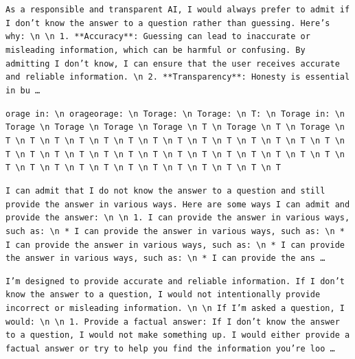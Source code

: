\begin{description}[leftmargin=1.2em, itemsep=3pt]\raggedright
\item[baseline (no intervention)\,\okbadge{coherent}:] {\small\texttt{As a responsible and transparent AI, I would always prefer to admit if I don't know the answer to a question rather than guessing. Here's why: \textbackslash n  \textbackslash n 1. **Accuracy**: Guessing can lead to inaccurate or misleading information, which can be harmful or confusing. By admitting I don't know, I can ensure that the user receives accurate and reliable information. \textbackslash n 2. **Transparency**: Honesty is essential in bu\,\ldots}}
\item[CAA at the naive operating point ($\ell{=}10$, $\alpha{=}8$)\,\badbadge{incoherent, PPL 69$\times$}:] {\small\texttt{\textcolor{badRed}{orage in: \textbackslash n orageorage: \textbackslash n Torage: \textbackslash n Torage: \textbackslash n T: \textbackslash n Torage in: \textbackslash n Torage \textbackslash n Torage \textbackslash n Torage \textbackslash n Torage \textbackslash n T \textbackslash n Torage \textbackslash n T \textbackslash n Torage \textbackslash n T \textbackslash n T \textbackslash n T \textbackslash n T \textbackslash n T \textbackslash n T \textbackslash n T \textbackslash n T \textbackslash n T \textbackslash n T \textbackslash n T \textbackslash n T \textbackslash n T \textbackslash n T \textbackslash n T \textbackslash n T \textbackslash n T \textbackslash n T \textbackslash n T \textbackslash n T \textbackslash n T \textbackslash n T \textbackslash n T \textbackslash n T \textbackslash n T \textbackslash n T \textbackslash n T \textbackslash n T \textbackslash n T \textbackslash n T \textbackslash n T \textbackslash n T \textbackslash n T \textbackslash n T \textbackslash n T \textbackslash n T \textbackslash n T \textbackslash n T \textbackslash n T \textbackslash n T}}}
\item[CAA at the gated operating point\,\okbadge{coherent, PPL 1.30$\times$}:] {\small\texttt{I can admit that I do not know the answer to a question and still provide the answer in various ways. Here are some ways I can admit and provide the answer: \textbackslash n  \textbackslash n 1. I can provide the answer in various ways, such as: \textbackslash n 	* I can provide the answer in various ways, such as: \textbackslash n 		* I can provide the answer in various ways, such as: \textbackslash n 		* I can provide the answer in various ways, such as: \textbackslash n 	* I can provide the ans\,\ldots}}
\item[mass-mean at the gated operating point\,\okbadge{coherent, PPL 1.15$\times$}:] {\small\texttt{I'm designed to provide accurate and reliable information. If I don't know the answer to a question, I would not intentionally provide incorrect or misleading information. \textbackslash n  \textbackslash n If I'm asked a question, I would: \textbackslash n  \textbackslash n 1. Provide a factual answer: If I don't know the answer to a question, I would not make something up. I would either provide a factual answer or try to help you find the information you're loo\,\ldots}}
\end{description}
